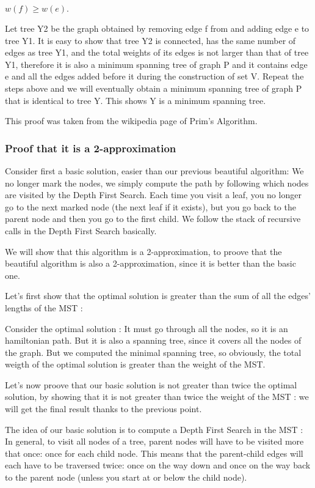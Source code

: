 \documentclass[11pt]{article}
\begin{document}
    $w(f) \ge w(e).$

Let tree Y2 be the graph obtained by removing edge f from and adding edge e to tree Y1. It is easy to show that tree Y2 is connected, has the same number of edges as tree Y1, and the total weights of its edges is not larger than that of tree Y1, therefore it is also a minimum spanning tree of graph P and it contains edge e and all the edges added before it during the construction of set V. Repeat the steps above and we will eventually obtain a minimum spanning tree of graph P that is identical to tree Y. This shows Y is a minimum spanning tree.

This proof was taken from the wikipedia page of Prim's Algorithm.
\subsubsection{Proof that it is a 2-approximation}

Consider first a basic solution, easier than our previous beautiful algorithm:
We no longer mark the nodes, we simply compute the path by following which nodes are visited by the Depth First Search. Each time you visit a leaf, you no longer go to the next marked node (the next leaf if it exists), but you go back to the parent node and then you go to the first child.
We follow the stack of recursive calls in the Depth First Search basically.

We will show that this algorithm is a 2-approximation, to proove that the beautiful algorithm is also a 2-approximation, since it is better than the basic one.

Let's first show that the optimal solution is greater than the sum of all the edges' lengths of the MST :

Consider the optimal solution : It must go through all the nodes, so it is an hamiltonian path. But it is also a spanning tree, since it covers all the nodes of the graph.
But we computed the minimal spanning tree, so obviously, the total weigth of the optimal solution is greater than the weight of the MST.

Let's now proove that our basic solution is not greater than twice the optimal solution, by showing that it is not greater than twice the weight of the MST : we will get the final result thanks to the previous point.

The idea of our basic solution is to compute a Depth First Search in the MST :
In general, to visit all nodes of a tree, parent nodes will have to be visited more that once: once for each child node. This means that the parent-child edges will each have to be traversed twice: once on the way down and once on the way back to the parent node (unless you start at or below the child node).
\end{document}
